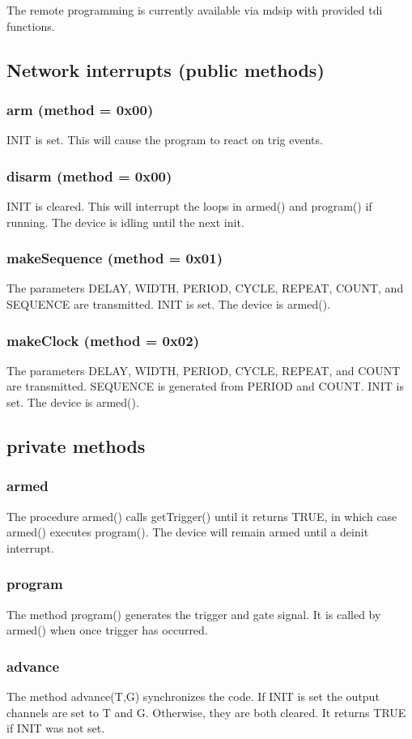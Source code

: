 \documentclass{article}
\begin{document}
The remote programming is currently available via mdsip with provided tdi functions.

\subsection*{Network interrupts (public methods)}
\subsubsection*{arm (method = 0x00)}
INIT is set. This will cause the program to react on trig events.
\subsubsection*{disarm (method = 0x00)}
INIT is cleared. This will interrupt the loops in armed() and program() if running. The device is idling until the next init.
\subsubsection*{makeSequence (method = 0x01)}
The parameters DELAY, WIDTH, PERIOD, CYCLE, REPEAT, COUNT, and SEQUENCE are transmitted. INIT is set. The device is armed().
\subsubsection*{makeClock (method = 0x02)}
The parameters DELAY, WIDTH, PERIOD, CYCLE, REPEAT, and COUNT are transmitted. SEQUENCE is generated from PERIOD and COUNT. INIT is set. The device is armed().
\subsection*{private methods}
\subsubsection*{armed}
The procedure armed() calls getTrigger() until it returns TRUE, in which case armed() executes program(). The device will remain armed until a deinit interrupt.
\subsubsection*{program}
The method program() generates the trigger and gate signal. It is called by armed() when once trigger has occurred.
\subsubsection*{advance}
The method advance(T,G) synchronizes the code. If INIT is set the output channels are set to T and G. Otherwise, they are both cleared. It returns TRUE if INIT was not set.
\end{document}
